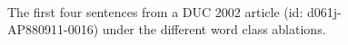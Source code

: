 \begin{figure}
{\begin{minipage}{\textwidth}
~\\
\end{minipage}}
\caption{The first four sentences from a DUC 2002 article (id: d061j-AP880911-0016) under the different word class ablations. }
\label{fig:wordabl}
\end{figure}
